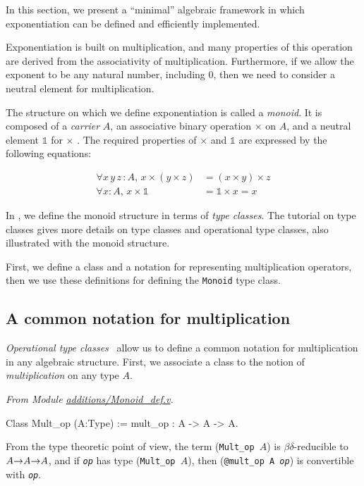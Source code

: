 In this section, we present a ``minimal'' algebraic framework in which  exponentiation can be defined and efficiently implemented.

Exponentiation is built on multiplication, and many properties of 
this operation are derived from the associativity of multiplication. 
Furthermore, if we allow the exponent to be any natural number, including $0$, 
then we need to consider a neutral element for multiplication.

The structure on which we define exponentiation is called a \emph{monoid}.
It is composed of a \emph{carrier} $A$, an associative binary operation $\times$ on $A$, and a neutral element $\mathds{1}$ for $\times$ . The required properties of $\times$ and
$\mathds{1}$ are expressed by the following equations:


\begin{align}
  \label{eq}
  \forall x\,y\,z\,:A,\, x\times (y \times z) &= (x\times y) \times z
  \\
\forall x:A,\, x \times \mathds{1}  &= \mathds{1}  \times x = x
\end{align}


In \coq{}, we define the monoid structure in terms of 
\emph{type classes}\cite{MS08,BS2011}. The tutorial on type classes \cite{PCMS} gives more details on type classes and
operational type classes, also illustrated with the monoid structure.


First, we define a class and a notation for representing multiplication operators, then we use
these definitions for defining the \texttt{Monoid} type class.

\subsection{A common notation for multiplication}
\label{op-classes}
\emph{Operational type classes}~\cite{BS2011}
allow us to define a common notation 
for multiplication in any algebraic structure. 
First, we associate a class to the notion of \emph{multiplication} 
on any type $A$.

\emph{From Module \href{../theories/html/hydras.additions.Monoid_def.html}{additions/Monoid\_def.v}.}

\begin{Coqsrc}
Class Mult_op (A:Type) := mult_op : A -> A -> A.  
\end{Coqsrc}

From the type theoretic point of view, the term (\texttt{Mult\_op $A$}) is 
$\beta\delta$-reducible to \texttt{$A\mbox{$\rightarrow$} A \mbox{$\rightarrow$} A$}, and
if \texttt{\it op} has type (\texttt{Mult\_op $A$}), then 
(\texttt{@mult\_op A {\it op}}) is convertible with \texttt{\it op}.

